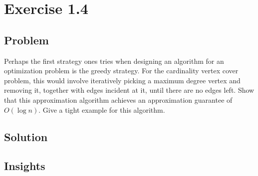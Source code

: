 \documentclass{article}
\begin{document}
\section*{Exercise 1.4}

\subsection*{Problem}

Perhaps the first strategy ones tries when designing an algorithm for an optimization 
problem is the greedy strategy. For the cardinality vertex cover problem, this would 
involve iteratively picking a maximum degree vertex and removing it, together with 
edges incident at it, until there are no edges left. Show that this approximation 
algorithm achieves an approximation guarantee of $O(\log n)$. Give a tight example for 
this algorithm.

\subsection*{Solution}















\subsection*{Insights}
\end{document}
